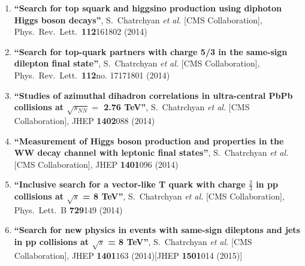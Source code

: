 \begin{enumerate}
\item%
{\bf ``Search for top squark and higgsino production using diphoton Higgs boson decays''}, 
  S.~Chatrchyan {\it et al.}  [CMS Collaboration], 
Phys.\ Rev.\ Lett.\  {\bf 112}161802 (2014) %


\item%
{\bf ``Search for top-quark partners with charge 5/3 in the same-sign dilepton final state''}, 
  S.~Chatrchyan {\it et al.}  [CMS Collaboration], 
Phys.\ Rev.\ Lett.\  {\bf 112}no. 17171801 (2014) %


\item%
{\bf ``Studies of azimuthal dihadron correlations in ultra-central PbPb collisions at $\sqrt{s_{NN}} =$ 2.76 TeV''}, 
  S.~Chatrchyan {\it et al.}  [CMS Collaboration], 
JHEP {\bf 1402}088 (2014) %


\item%
{\bf ``Measurement of Higgs boson production and properties in the WW decay channel with leptonic final states''}, 
  S.~Chatrchyan {\it et al.}  [CMS Collaboration], 
JHEP {\bf 1401}096 (2014) %


\item%
{\bf ``Inclusive search for a vector-like T quark with charge $\frac{2}{3}$ in pp collisions at $\sqrt{s}$ = 8 TeV''}, 
  S.~Chatrchyan {\it et al.}  [CMS Collaboration], 
Phys.\ Lett.\ B {\bf 729}149 (2014) %


\item%
{\bf ``Search for new physics in events with same-sign dileptons and jets in pp collisions at $\sqrt{s}$ = 8 TeV''}, 
  S.~Chatrchyan {\it et al.}  [CMS Collaboration], 
JHEP {\bf 1401}163 (2014)[JHEP {\bf 1501}014 (2015)] %



\end{enumerate}
